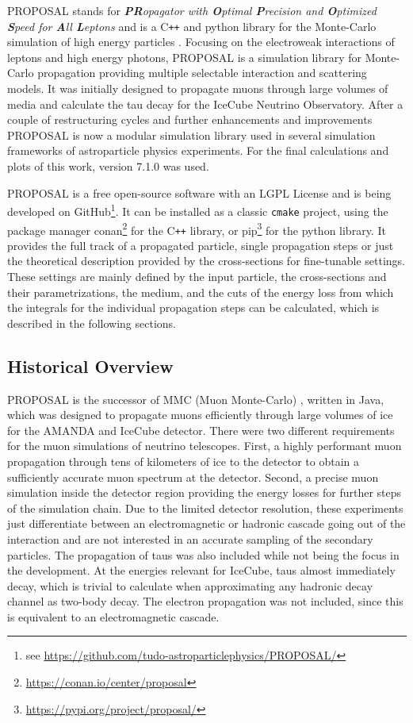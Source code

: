 PROPOSAL stands for \textit{\textbf{PR}opagator with \textbf{O}ptimal \textbf{P}recision and \textbf{O}ptimized \textbf{S}peed for \textbf{A}ll \textbf{L}eptons} and is a C\texttt{++} and python library for the Monte-Carlo simulation of high energy particles \cite{Koehne13PROPOSAL}.
Focusing on the electroweak interactions of leptons and high energy photons, PROPOSAL is a simulation library for Monte-Carlo propagation providing multiple selectable interaction and scattering models.
It was initially designed to propagate muons through large volumes of media and calculate the tau decay for the IceCube Neutrino Observatory.
After a couple of restructuring cycles and further enhancements and improvements PROPOSAL is now a modular simulation library used in several simulation frameworks of astroparticle physics experiments.
For the final calculations and plots of this work, version 7.1.0 was used.

PROPOSAL is a free open-source software with an LGPL License and is being developed on GitHub\footnote{see \url{https://github.com/tudo-astroparticlephysics/PROPOSAL/}}.
It can be installed as a classic \texttt{cmake} project, using the package manager conan\footnote{\url{https://conan.io/center/proposal}} for the C\texttt{++} library, or pip\footnote{\url{https://pypi.org/project/proposal/}} for the python library.
It provides the full track of a propagated particle, single propagation steps or just the theoretical description provided by the cross-sections for fine-tunable settings.
These settings are mainly defined by the input particle, the cross-sections and their parametrizations, the medium, and the cuts of the energy loss from which the integrals for the individual propagation steps can be calculated, which is described in the following sections.

%

\subsection{Historical Overview}

PROPOSAL is the successor of MMC (Muon Monte-Carlo) \cite{Chirkin03PhD, Chirkin04MMC}, written in Java, which was designed to propagate muons efficiently through large volumes of ice for the AMANDA and IceCube detector.
There were two different requirements for the muon simulations of neutrino telescopes.
First, a highly performant muon propagation through tens of kilometers of ice to the detector to obtain a sufficiently accurate muon spectrum at the detector.
Second, a precise muon simulation inside the detector region providing the energy losses for further steps of the simulation chain.
Due to the limited detector resolution, these experiments just differentiate between an electromagnetic or hadronic cascade going out of the interaction and are not interested in an accurate sampling of the secondary particles.
The propagation of taus was also included while not being the focus in the development.
At the energies relevant for IceCube, taus almost immediately decay, which is trivial to calculate when approximating any hadronic decay channel as two-body decay.
The electron propagation was not included, since this is equivalent to an electromagnetic cascade.

